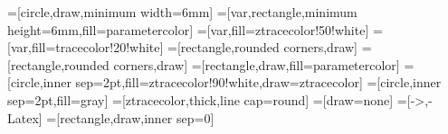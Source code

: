 \usetikzlibrary{arrows.meta}
\usetikzlibrary{backgrounds}
\usetikzlibrary{calc}
\usetikzlibrary{decorations.pathreplacing}
\usetikzlibrary{fit}
\usetikzlibrary{spy}
\usetikzlibrary{3d}
\usetikzlibrary{matrix}
\pgfplotsset{compat=1.18}

=[circle,draw,minimum width=6mm]
=[var,rectangle,minimum height=6mm,fill=parametercolor]
=[var,fill=ztracecolor!50!white]
=[var,fill=tracecolor!20!white]
=[rectangle,rounded corners,draw]
=[rectangle,rounded corners,draw]
=[rectangle,draw,fill=parametercolor]
=[circle,inner sep=2pt,fill=ztracecolor!90!white,draw=ztracecolor]
=[circle,inner sep=2pt,fill=gray]
=[ztracecolor,thick,line cap=round]
=[draw=none]
=[->,-{Latex}]
=[rectangle,draw,inner sep=0]
